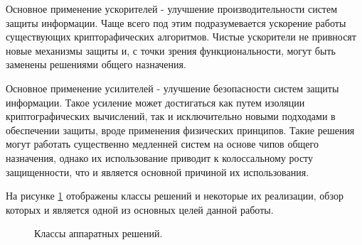 \documentclass[a4paper,12pt]{article}
\begin{document}
Основное применение ускорителей - улучшение производительности систем защиты информации. Чаще всего под этим подразумевается ускорение работы существующих крипторафических алгоритмов. Чистые ускорители не привносят новые механизмы защиты и, с точки зрения функциональности, могут быть заменены решениями общего назначения.

Основное применение усилителей - улучшение безопасности систем защиты информации. Такое усиление может достигаться как путем изоляции криптографических вычислений, так и исключительно новыми подходами в обеспечении защиты, вроде применения физических принципов. Такие решения могут работать существенно медленней систем на основе чипов общего назначения, однако их использование приводит к колоссальному росту защищенности, что и является основной причиной их использования.

На рисунке \ref{asic-classes} отображены классы решений и некоторые их реализации, обзор которых и является одной из основных целей данной работы.  



\begin{figure}
\def\firstcircle{(0,0) circle (2.5cm)}
\def\secondcircle{(0:4cm) circle (2.5cm)}
\def\secondcircle{(0:4cm) circle (2.5cm)}



\setlength{\parskip}{5mm}

\begin{center}
\end{center}
\caption{Классы аппаратных решений.}
\label{asic-classes}
\end{figure}
\end{document}
